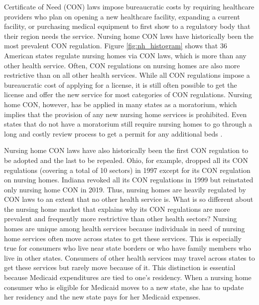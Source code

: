 \documentclass[../Main.tex]{subfiles}
\begin{document}
 Certificate of Need (CON) laws impose bureaucratic costs by requiring healthcare providers who plan on opening a new healthcare facility, expanding a current facility, or purchasing medical equipment to first show to a regulatory body that their region needs the service. Nursing home CON laws have historically been the most prevalent CON regulation. Figure \ref{fig:nh_histogram} shows that 36 American states regulate nursing homes via CON laws, which is more than any other health service. Often, CON regulations on nursing homes are also more restrictive than on all other health services. While all CON regulations impose a bureaucratic cost of applying for a license, it is still often possible to get the license and offer the new service for most categories of CON regulations. Nursing home CON, however, has be applied in many states as a moratorium, which implies that the provision of any new nursing home services is prohibited. Even states that do not have a moratorium still require nursing homes to go through a long and costly review process to get a permit for any additional beds \citep{american2020american}. 
 
 Nursing home CON laws have also historically been the first CON regulation to be adopted and the last to be repealed. Ohio, for example, dropped all its CON regulations (covering a total of 10 sectors) in 1997 except for its CON regulation on nursing homes. Indiana revoked all its CON regulations in 1999 but reinstated only nursing home CON in 2019. Thus, nursing homes are heavily regulated by CON laws to an extent that no other health service is. What is so different about the nursing home market that explains why its CON regulations are more prevalent and frequently more restrictive than other health sectors? Nursing homes are unique among health services because individuals in need of nursing home services often move across states to get these services. This is especially true for consumers who live near state borders or who have family members who live in other states. Consumers of other health services may travel across states to get these services but rarely move because of it. This distinction is essential because Medicaid expenditures are tied to one's residency. When a nursing home consumer who is eligible for Medicaid moves to a new state, she has to update her residency and the new state pays for her Medicaid expenses.  
 
\end{document}
